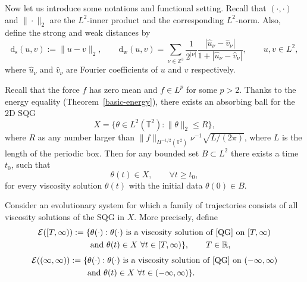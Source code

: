 \documentclass{amsart}
\newcommand{\ds}{\mathrm{d}_{\mathrm{s}}}
\newcommand{\dw}{\mathrm{d}_{\mathrm{w}}}
\newcommand{\Ec}{\mathcal{E}}
\numberwithin{Theorem}{section}
\theoremstyle{definition}
\theoremstyle{remark}
\renewcommand{\th}{\theta}
\begin{document}
Now let us introduce some notations and functional setting.
Recall that $(\cdot,\cdot)$ and $\|\cdot\|_2$ are the $L^2$-inner product and the
corresponding $L^2$-norm.
Also, define the strong and weak distances by
\[
\ds(u,v):=\|u-v\|_2, \qquad
\dw(u,v)= \sum_{\nu \in \mathbb{Z}^3} \frac{1}{2^{|\nu|}}
\frac{|\hat{u}_{\nu}-\hat{v}_{\nu}|}{1 + |\hat{u}_{\nu}-\hat{v}_{\nu}|},
\qquad u,v \in L^2,
\]
where $\hat{u}_{\nu}$ and $\hat{v}_{\nu}$ are Fourier coefficients of $u$
and $v$ respectively.


Recall that the force $f$ has zero mean and $f \in L^{p}$ for some $p>2$. Thanks to the energy equality (Theorem~\ref{basic-energy}), 
there exists an absorbing ball for the 2D SQG
\[
X= \{\theta\in L^2(\mathbb{T}^2): \|\th\|_2 \leq R\},
\]
where $R$ as any number larger than $\|f\|_{H^{-1/2}(\mathbb{T}^2)} \nu^{-1} \sqrt{L/(2\pi)}$, where $L$ is the length of the periodic box.
Then for any bounded set $B \subset L^2$
there exists a time $t_0$, such that
\[
\th(t) \in X, \qquad \forall t\geq t_0,
\]
for every viscosity solution $\theta(t)$ with the initial data $\theta(0) \in B$.



Consider an evolutionary system for which
a family of trajectories consists
of all viscosity solutions of the SQG
in $X$. More precisely, define
\[
\begin{split}
\Ec([T,\infty)) := \{&\th(\cdot): \theta(\cdot)
\mbox{ is a viscosity solution of \eqref{QG} on } [T,\infty)\\
&\mbox{and } \th(t) \in X \ \forall t \in [T,\infty)\},
\qquad T \in \mathbb{R},
\end{split}
\]
\[
\begin{split}
\Ec((\infty,\infty)) := \{&\th(\cdot): \theta(\cdot)
\mbox{ is a viscosity solution of \eqref{QG} on } (-\infty,\infty)\\
&\mbox{and } \th(t) \in X \ \forall t \in (-\infty,\infty)\}.
\end{split}
\]
\end{document}
